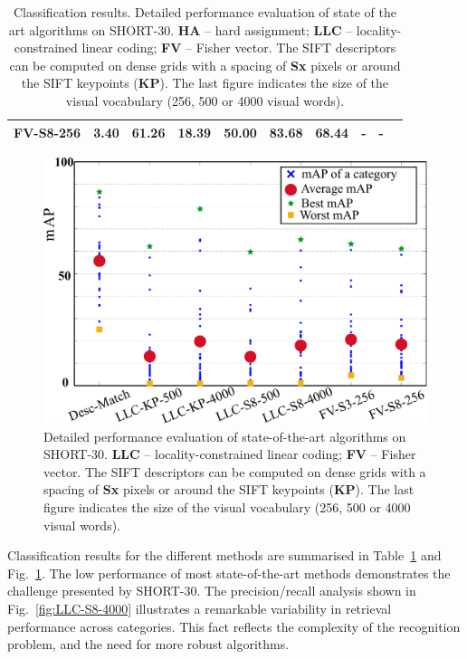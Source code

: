 \begin{table}
\begin{adjustbox}{max width=1.2\textwidth,center}
\begin{tabular}{cccccccccccccc}
\hline
FV-S8-256 & 3.40 & 61.26 &  18.39 & 50.00 & 83.68 & 68.44  & \multicolumn{3}{c}{-} & \multicolumn{3}{c}{-}\\
	\bottomrule
\end{tabular}
\end{adjustbox}
\caption{Classification results. Detailed performance evaluation of state of the art algorithms on SHORT-30. \textbf{HA} -- hard assignment; \textbf{LLC} -- locality-constrained linear coding; \textbf{FV} -- Fisher vector. The SIFT descriptors can be computed on dense grids with a spacing of \textbf{Sx} pixels or around the SIFT keypoints (\textbf{KP}). The last figure indicates the size of the visual vocabulary (256, 500 or 4000 visual words).}
\label{table:classification_results}
\end{table}

\begin{figure}[]
\begin{center}
\includegraphics[width=\linewidth]{./gfx/Chapter03/methods-v5.pdf}
\caption{Detailed performance evaluation of state-of-the-art algorithms on SHORT-30. \textbf{LLC} -- locality-constrained linear coding; \textbf{FV} -- Fisher vector. The SIFT descriptors can be computed on dense grids with a spacing of \textbf{Sx} pixels or around the SIFT keypoints (\textbf{KP}). The last figure indicates the size of the visual vocabulary (256, 500 or 4000 visual words).}
\label{fig:methods}
\end{center}
\end{figure}




Classification results for the different methods are summarised in Table~\ref{table:classification_results}  and Fig.~\ref{fig:methods}. The low performance of most state-of-the-art methods demonstrates the challenge presented by SHORT-30. The precision/recall analysis shown in Fig.~\ref{fig:LLC-S8-4000} illustrates a remarkable variability in retrieval performance across categories. This fact reflects the complexity of the recognition problem, and the need for more robust algorithms. 


